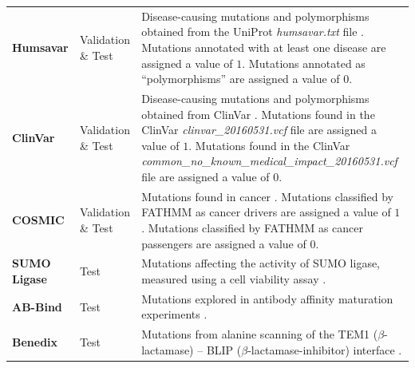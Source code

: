 \begin{table}[tb]
\begin{tabular}{ l |  p{1.8cm} | p{9.4cm} }
		\textbf{Humsavar}     & Validation \& Test & Disease-causing mutations and polymorphisms obtained from the UniProt \textit{humsavar.txt} file \cite{consortium_uniprot:_2015}. Mutations annotated with at least one disease are assigned a value of $1$. Mutations annotated as ``polymorphisms'' are assigned a value of $0$.                                         \\
		\textbf{ClinVar}      & Validation \& Test & Disease-causing mutations and polymorphisms obtained from ClinVar \cite{landrum_clinvar:_2016}. Mutations found in the ClinVar \textit{clinvar\-\_20160531.vcf} file are assigned a value of $1$. Mutations found in the ClinVar \textit{common\-\_no\-\_known\-\_medical\-\_impact\-\_20160531.vcf} file are assigned a value of $0$. \\
		\textbf{COSMIC}       & Validation \& Test & Mutations found in cancer \cite{forbes_cosmic:_2015}. Mutations classified by FATHMM \cite{shihab_ranking_2014} as cancer drivers are assigned a value of $1$. Mutations classified by FATHMM as cancer passengers are assigned a value of $0$.                                                                            \\
		\textbf{SUMO Ligase}  & Test               & Mutations affecting the activity of SUMO ligase, measured using a cell viability assay \cite{cagi4_sumo_ligase}.                                                                                                                                                                                                             \\
		\textbf{AB-Bind}      & Test               & Mutations explored in antibody affinity maturation experiments \cite{sirin_ab-bind:_2016}.                                                                                                                                                                                                                                   \\
		\textbf{Benedix}      & Test               & Mutations from alanine scanning of the TEM1 ($\beta$-lactamase) -- BLIP ($\beta$-lactamase-inhibitor) interface \cite{benedix_predicting_2009}.                                                                                                                                                                              \\
		\bottomrule
	\end{tabular}
\end{table}

